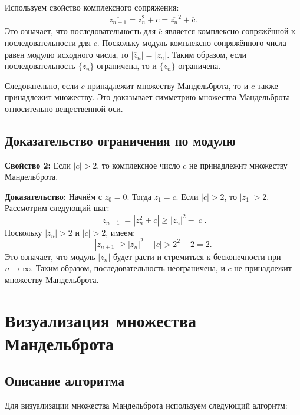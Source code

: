 \documentclass{article}
\begin{document}
	Используем свойство комплексного сопряжения:
	\begin{equation}
		\overline{z_{n+1}} = \overline{z_n^2 + c} = \overline{z_n}^2 + \overline{c}.
	\end{equation}
	Это означает, что последовательность для $\overline{c}$ является комплексно-сопряжённой к последовательности для $c$. Поскольку модуль комплексно-сопряжённого числа равен модулю исходного числа, то $|\overline{z}_n| = |z_n|$. Таким образом, если последовательность $\{z_n\}$ ограничена, то и $\{\overline{z}_n\}$ ограничена.
	
	Следовательно, если $c$ принадлежит множеству Мандельброта, то и $\overline{c}$ также принадлежит множеству. Это доказывает симметрию множества Мандельброта относительно вещественной оси.
	
	\subsection{Доказательство ограничения по модулю}
	\textbf{Свойство 2:} Если $|c| > 2$, то комплексное число $c$ не принадлежит множеству Мандельброта.
	
	\textbf{Доказательство:}
	Начнём с $z_0 = 0$. Тогда $z_1 = c$. Если $|c| > 2$, то $|z_1| > 2$. Рассмотрим следующий шаг:
	\begin{equation}
		|z_{n+1}| = |z_n^2 + c| \geq |z_n|^2 - |c|.
	\end{equation}
	Поскольку $|z_n| > 2$ и $|c| > 2$, имеем:
	\begin{equation}
		|z_{n+1}| \geq |z_n|^2 - |c| > 2^2 - 2 = 2.
	\end{equation}
	Это означает, что модуль $|z_n|$ будет расти и стремиться к бесконечности при $n \to \infty$. Таким образом, последовательность неограничена, и $c$ не принадлежит множеству Мандельброта.
	
	\newpage
	
	\section{Визуализация множества Мандельброта}
	
	\subsection{Описание алгоритма}
	Для визуализации множества Мандельброта используем следующий алгоритм:
	
\end{document}
